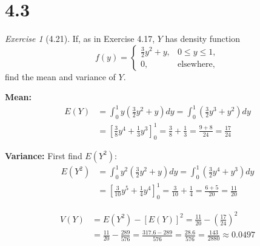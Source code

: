 \documentclass[12pt]{amsart}
\makeatletter
\theoremstyle{remark}
\newtheorem*{exercise}{Exercise}%
\renewenvironment{proof}[1][\proofname]{\par\doublespacing
  \pushQED{\qed}%
  \normalfont \topsep6\p@\@plus6\p@\relax
  \list{}{%
    \settowidth{\leftmargin}{\itshape\proofname:\hskip\labelsep}%
    \setlength{\labelwidth}{0pt}%
    \setlength{\itemindent}{-\leftmargin}%
  }%
  \item[\hskip\labelsep\itshape#1\@addpunct{:}]\ignorespaces
}{%
  \popQED\endlist\@endpefalse
  \singlespacing
}
\theoremstyle{mycomment}
\makeatother
\begin{document}
\section*{4.3}
\begin{exercise}[4.21]
If, as in Exercise 4.17, $Y$ has density function
$$f(y) = \begin{cases}
\frac{3}{2}y^2 + y, & 0 \leq y \leq 1, \\
0, & \text{elsewhere},
\end{cases}$$
find the mean and variance of $Y$.

\begin{proof}[Solution]
\textbf{Mean:}
\begin{align*}
E(Y) &= \int_0^1 y \left(\frac{3}{2}y^2 + y\right) dy = \int_0^1 \left(\frac{3}{2}y^3 + y^2\right) dy \\
&= \left[\frac{3}{8}y^4 + \frac{1}{3}y^3\right]_0^1 = \frac{3}{8} + \frac{1}{3} = \frac{9 + 8}{24} = \frac{17}{24}
\end{align*}

\textbf{Variance:} First find $E(Y^2)$:
\begin{align*}
E(Y^2) &= \int_0^1 y^2 \left(\frac{3}{2}y^2 + y\right) dy = \int_0^1 \left(\frac{3}{2}y^4 + y^3\right) dy \\
&= \left[\frac{3}{10}y^5 + \frac{1}{4}y^4\right]_0^1 = \frac{3}{10} + \frac{1}{4} = \frac{6 + 5}{20} = \frac{11}{20}
\end{align*}

\begin{align*}
V(Y) &= E(Y^2) - [E(Y)]^2 = \frac{11}{20} - \left(\frac{17}{24}\right)^2 \\
&= \frac{11}{20} - \frac{289}{576} = \frac{317.6 - 289}{576} = \frac{28.6}{576} = \frac{143}{2880} \approx 0.0497
\end{align*}

\end{proof}
\end{exercise}
\end{document}
